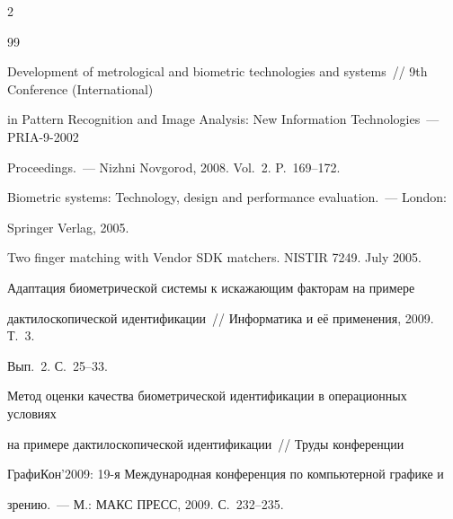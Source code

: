 \begin{multicols}{2}
{{\begin{thebibliography}{99}


Development of metrological and biometric technologies and systems~// 9th Conference (International) 


in Pattern Recognition and Image Analysis: New Information Technologies~--- PRIA-9-2002 


Proceedings.~--- Nizhni Novgorod, 2008. Vol.~2. P.~169--172.









Biometric systems: Technology, design and performance evaluation.~--- London: 


Springer Verlag, 2005.









Two finger matching with Vendor SDK matchers. NISTIR 7249. July 2005.









Адаптация биометрической системы к искажающим факторам на примере 


дактилоскопической идентификации~// Информатика и её применения, 2009. Т.~3. 


Вып.~2. С.~25--33.


\pagebreak









Метод оценки качества биометрической идентификации в операционных условиях 


на примере дактилоскопической идентификации~// Труды конференции 


ГрафиКон'2009: 19-я Международная конференция по компьютерной графике и 


зрению.~--- М.: МАКС ПРЕСС, 2009. С.~232--235.










\end{thebibliography}}}
\end{multicols}
